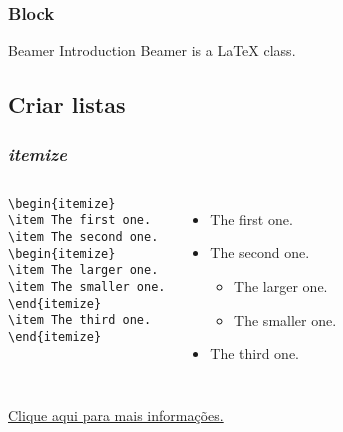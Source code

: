 \documentclass[article,8pt]{beamer}%
\begin{document}
\begin{frame}
\frametitle{Block}

\begin{block}{Beamer Introduction}
Beamer is a { \LaTeX} class.
\end{block}

\end{frame}

\subsection{Criar listas}
\begin{frame}[fragile]
\frametitle{\emph{itemize}}

\begin{columns}
\begin{block}
\scriptsize{
\begin{verbatim}
\begin{itemize}
\item The first one.
\item The second one.
\begin{itemize}
\item The larger one.
\item The smaller one.
\end{itemize}
\item The third one.
\end{itemize}
\end{verbatim}
}
\end{block}

\begin{itemize}
\item The first one.
\item The second one.
\begin{itemize}
\item The larger one.
\item The smaller one.
\end{itemize}
\item The third one.
\end{itemize}
\end{columns}
\vspace{1.5cm}
\href{https://tug.ctan.org/macros/latex/contrib/beamer/doc/beameruserguide.pdf}{Clique aqui para mais informações.}
\end{frame}
\end{document}
